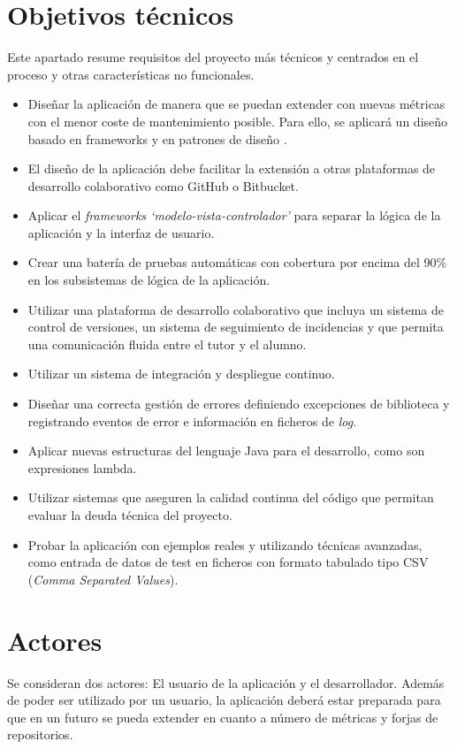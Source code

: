 \section{Objetivos técnicos}
Este apartado resume requisitos del proyecto más técnicos y centrados en el proceso y otras características no funcionales.
\begin{itemize}
	\tightlist
	\item Diseñar la aplicación de manera que se puedan extender con nuevas métricas con el menor coste de mantenimiento posible. Para ello, se aplicará un diseño basado en frameworks y en patrones de diseño \citep{gamma_patrones_2002}.
	\item El diseño de la aplicación debe facilitar la extensión a otras plataformas de desarrollo colaborativo como GitHub o Bitbucket.
	\item Aplicar el \textit{frameworks `modelo-vista-controlador'} para separar la lógica de la aplicación y la interfaz de usuario.
	\item Crear una batería de pruebas automáticas con cobertura por encima del 90\% en los subsistemas de lógica de la aplicación.
	\item Utilizar una plataforma de desarrollo colaborativo que incluya un sistema de control de versiones, un sistema de seguimiento de incidencias y que permita una comunicación fluida entre el tutor y el alumno.
	\item Utilizar un sistema de integración y despliegue continuo.
	\item Diseñar una correcta gestión de errores definiendo excepciones de biblioteca y registrando eventos de error e información en ficheros de \textit{log}. 
	\item Aplicar nuevas estructuras  del lenguaje Java para el desarrollo, como son expresiones lambda. 
	\item Utilizar sistemas que aseguren la calidad continua del código que permitan evaluar la deuda técnica del proyecto.
	\item Probar la aplicación con ejemplos reales y utilizando técnicas avanzadas, como entrada de datos de test en ficheros con formato tabulado tipo CSV (\textit{Comma Separated Values}). 	
\end{itemize}

\section{Actores}
Se consideran dos actores: El usuario de la aplicación y el desarrollador. Además de poder ser utilizado por un usuario, la aplicación deberá estar preparada para que en un futuro se pueda extender en cuanto a número de métricas y forjas de repositorios.

